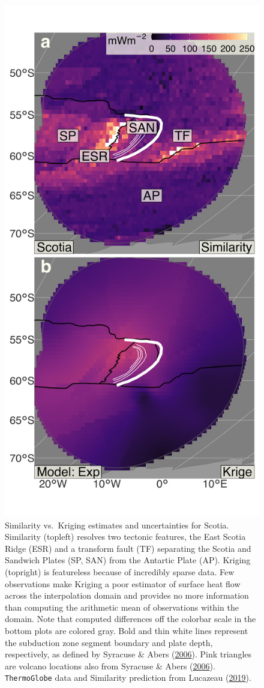 \begin{figure}[htbp]

{\centering \includegraphics[width=0.55\linewidth,]{assets/figs/chpt3/ScotiaDiffComp} 

}

\caption[Similarity vs. Kriging estimates and uncertainties for Scotia]{Similarity vs.~Kriging estimates and uncertainties for Scotia. Similarity (topleft) resolves two tectonic features, the East Scotia Ridge (ESR) and a transform fault (TF) separating the Scotia and Sandwich Plates (SP, SAN) from the Antartic Plate (AP). Kriging (topright) is featureless because of incredibly sparse data. Few observations make Kriging a poor estimator of surface heat flow across the interpolation domain and provides no more information than computing the arithmetic mean of observations within the domain. Note that computed differences off the colorbar scale in the bottom plots are colored gray. Bold and thin white lines represent the subduction zone segment boundary and plate depth, respectively, as defined by Syracuse \& Abers (\protect\hyperlink{ref-syracuse2006}{2006}). Pink triangles are volcano locations also from Syracuse \& Abers (\protect\hyperlink{ref-syracuse2006}{2006}). \texttt{ThermoGlobe} data and Similarity prediction from Lucazeau (\protect\hyperlink{ref-lucazeau2019}{2019}).}\label{fig:scotiaDiff}
\end{figure}



